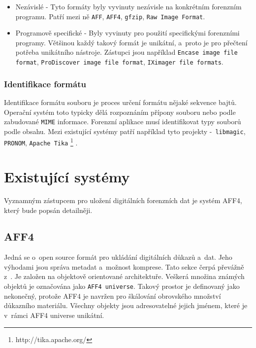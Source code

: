 \begin{itemize}
\item Nezávislé - Tyto formáty byly vyvinuty nezávisle na konkrétním forenzním programu. Patří mezi ně \texttt{AFF}, \texttt{AFF4}, \texttt{gfzip}, \texttt{Raw Image Format}.

\item Programově specifické - Byly vyvinuty pro použití specifickými forenzními programy. Většinou každý takový formát je unikátní, a~proto je pro přečtení potřeba unikátního nástroje.
Zástupci jsou například \texttt{Encase image file format}, \texttt{ProDiscover image file format}, \texttt{IXimager file formats}.
\end{itemize}

\subsubsection{Identifikace formátu}
Identifikace formátu souboru je proces určení formátu nějaké sekvence bajtů. Operační systém toto typicky dělá rozpoznáním přípony souboru nebo podle zabudované \texttt{MIME} informace. Forenzní aplikace musí identifikovat typy souborů podle obsahu. Mezi existující systémy patří například tyto projekty \--\ \texttt{libmagic}, \texttt{PRONOM}, \texttt{Apache Tika} \footnote{http://tika.apache.org/} \cite{forensicswikiFFIdentification}.

\section{Existující systémy}
Vyznamným zástupcem pro uložení digitálních forenzních dat je systém AFF4, který bude popsán detailněji.

\subsection{AFF4}
Jedná se o~open source formát pro ukládání digitálních důkazů a~dat. Jeho výhodami jsou správa metadat a~možnost komprese. Tato sekce čerpá převážně z~\cite{aff4}. Je založen na objektově orientované architektuře. Veškerá množina známých objektů je označována jako \texttt{AFF4 universe}. Takový prostor je definovaný jako nekonečný, protože AFF4 je navržen pro škálování obrovského množství důkazního materiálu. Všechny objekty jsou adresovatelné jejich jménem, které je v~rámci AFF4 universe unikátní.

\vspace{0.5cm}

